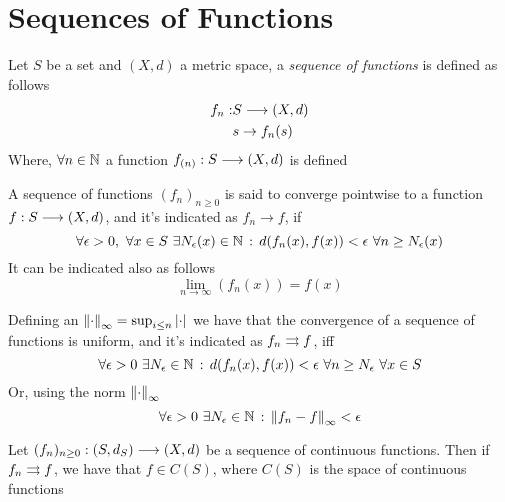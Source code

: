 \documentclass[../complete.tex]{subfiles}
\begin{document}
\section{Sequences of Functions}
\begin{dfn}
	Let $S$ be a set and $(X,d)$ a metric space, a \textit{sequence of functions} is defined as follows
	\begin{equation}
		\begin{aligned}
			f_n:&S\overset{}{\longrightarrow}(X,d)\\
			&s\to f_n(s)
		\end{aligned}
		\label{eq:seqfunc}
	\end{equation}
	Where, $\forall n\in\mathbb{N}$ a function $f_{(n)}:S\overset{}{\longrightarrow}(X,d)$ is defined
\end{dfn}
\begin{dfn}
	A sequence of functions $(f_n)_{n\ge0}$ is said to converge pointwise to a function $f:S\overset{}{\longrightarrow}(X,d)$, and it's indicated as $f_n\to f$, if
	\begin{equation}
		\forall\epsilon>0,\ \forall x\in S\ \exists N_\epsilon(x)\in\N\st d(f_n(x),f(x))<\epsilon\ \forall n\ge N_\epsilon(x)
		\label{eq:pointwiseconv}
	\end{equation}
	It can be indicated also as follows
	\begin{equation}
		\lim_{n\to\infty}(f_n(x))=f(x)
		\label{eq:pointwiseconv2}
	\end{equation}
\end{dfn}
\begin{dfn}
	Defining an $\norm{\cdot}_\infty=\sup_{i\le n}\abs{\cdot}$ we have that the convergence of a sequence of functions is uniform, and it's indicated as $f_n\rightrightarrows f$, iff
	\begin{equation}
		\forall\epsilon>0\ \exists N_\epsilon\in\mathbb{N}\, :\,  d(f_n(x),f(x))<\epsilon\ \forall n\ge N_\epsilon\ \forall x\in S
		\label{eq:uniformconv}
	\end{equation}
	Or, using the norm $\norm{\cdot}_{\infty}$
	\begin{equation}
		\forall\epsilon>0\ \exists N_\epsilon\in\mathbb{N}\, :\, \norm{f_n-f}_{\infty}<\epsilon
		\label{eq:uniformconv2}
	\end{equation}
\end{dfn}
\begin{thm}
	Let $(f_n)_{n\ge0}:(S,d_S)\overset{}{\longrightarrow}(X,d)$ be a sequence of continuous functions. Then if $f_n\rightrightarrows f$, we have that $f\in C(S)$, where $C(S)$ is the space of continuous functions
\end{thm}
\end{document}
